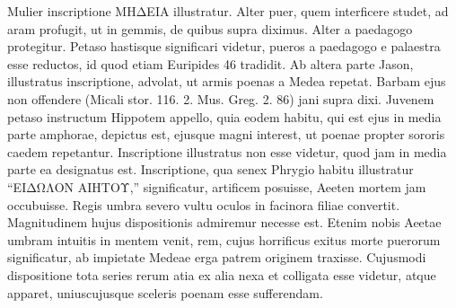 \documentclass[landscape, a4paper, 11pt, oneside, polutonikogreek, german]{article}
\begin{document}
Mulier inscriptione ΜΗΔΕΙΑ illustratur. Alter puer, quem interficere studet, ad aram profugit, ut in gemmis, de quibus supra diximus. Alter a paedagogo protegitur. Petaso hastisque significari videtur, pueros a paedagogo e palaestra esse reductos, id quod etiam Euripides 46 tradidit. Ab altera parte Jason, illustratus inscriptione, advolat, ut armis poenas a Medea repetat. Barbam ejus non offendere (Micali stor. 116. 2. Mus. Greg. 2. 86) jani supra dixi. Juvenem petaso instructum Hippotem appello, quia eodem habitu, qui est ejus in media parte amphorae, depictus est, ejusque magni interest, ut poenae propter sororis caedem repetantur. Inscriptione illustratus non esse videtur, quod jam in media parte ea designatus est. Inscriptione, qua senex Phrygio habitu illustratur "`ΕΙΔΩΛΟΝ ΑΙΗΤΟΥ,"' significatur, artificem posuisse, Aeeten mortem jam occubuisse. Regis umbra severo vultu oculos in facinora filiae convertit. Magnitudinem hujus dispositionis admiremur necesse est. Etenim nobis Aeetae umbram intuitis in mentem venit, rem, cujus horrificus exitus morte puerorum significatur, ab impietate Medeae erga patrem originem traxisse. Cujusmodi dispositione tota series rerum atia ex alia nexa et colligata esse videtur, atque apparet, uniuscujusque sceleris poenam esse sufferendam.
\end{document}
